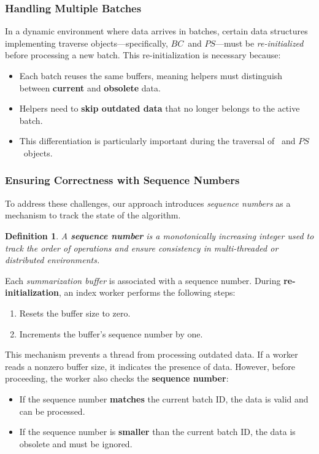\documentclass[a4paper,11pt,twoside,openany]{book}
\newtheorem{definition}{Definition}
\newcommand{\BC}{\mbox{$\mathit{BC}$}}
\newcommand{\PS}{\mbox{$\mathit{PS}$}}
\begin{document}
\subsubsection{Handling Multiple Batches}  

In a dynamic environment where data arrives in batches, certain data structures
implementing traverse objects—specifically, \BC\ and \PS—must be
\textit{re-initialized} before processing a new batch. This re-initialization
is necessary because:  
\begin{itemize}  
    \item Each batch reuses the same buffers, meaning helpers must distinguish
    between \textbf{current} and \textbf{obsolete} data.  
    \item Helpers need to \textbf{skip outdated data} that no longer belongs to
    the active batch.  
    \item This differentiation is particularly important during the traversal of
    \TP\ and \PS\ objects.  
\end{itemize}  

\subsubsection{Ensuring Correctness with Sequence Numbers}  

To address these challenges, our approach introduces \textit{sequence numbers}
as a mechanism to track the state of the algorithm.  

\begin{definition}  
A \textbf{sequence number} is a monotonically increasing integer used to track  
the order of operations and ensure consistency in multi-threaded or
distributed environments.  
\end{definition}  

Each \textit{summarization buffer} is associated with a sequence number.
During \textbf{re-initialization}, an index worker performs the following steps:  
\begin{enumerate}  
    \item Resets the buffer size to zero.  
    \item Increments the buffer's sequence number by one.  
\end{enumerate}  

This mechanism prevents a thread from processing outdated data. If a worker reads
a nonzero buffer size, it indicates the presence of data. However, before proceeding,
the worker also checks the \textbf{sequence number}:  
\begin{itemize}  
    \item If the sequence number \textbf{matches} the current batch ID,
     the data is valid and can be processed.  
    \item If the sequence number is \textbf{smaller} than the current batch ID,
     the data is obsolete and must be ignored.  
\end{itemize}  
\end{document}
